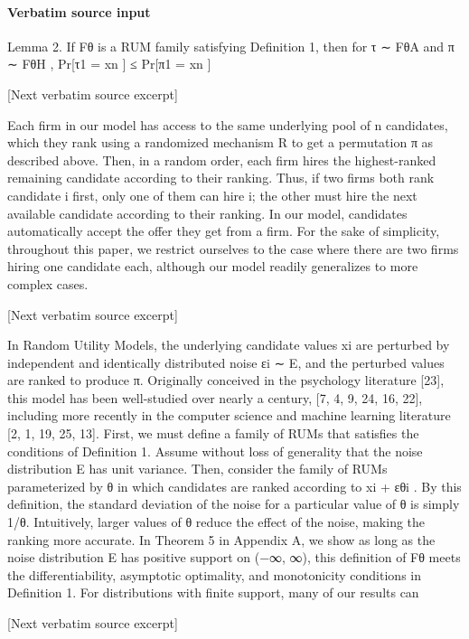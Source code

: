 \documentclass[10pt]{article}
\begin{document}
\paragraph{Verbatim source input}
\begin{ReviewVerbatim}
Lemma 2. If Fθ is a RUM family satisfying Definition 1, then for τ ∼ FθA and π ∼ FθH ,
Pr[τ1 = xn ] ≤ Pr[π1 = xn ]

[Next verbatim source excerpt]

Each firm in our model has access to the same underlying pool of n candidates, which they rank using
a randomized mechanism R to get a permutation π as described above. Then, in a random order, each
firm hires the highest-ranked remaining candidate according to their ranking. Thus, if two firms both rank
candidate i first, only one of them can hire i; the other must hire the next available candidate according to
their ranking. In our model, candidates automatically accept the offer they get from a firm. For the sake
of simplicity, throughout this paper, we restrict ourselves to the case where there are two firms hiring one
candidate each, although our model readily generalizes to more complex cases.

[Next verbatim source excerpt]

In Random Utility Models, the underlying candidate values xi are perturbed by independent and identically
distributed noise εi ∼ E, and the perturbed values are ranked to produce π. Originally conceived in the
psychology literature [23], this model has been well-studied over nearly a century, [7, 4, 9, 24, 16, 22],
including more recently in the computer science and machine learning literature [2, 1, 19, 25, 13].
First, we must define a family of RUMs that satisfies the conditions of Definition 1. Assume without loss of
generality that the noise distribution E has unit variance. Then, consider the family of RUMs parameterized
by θ in which candidates are ranked according to xi + εθi . By this definition, the standard deviation of the
noise for a particular value of θ is simply 1/θ. Intuitively, larger values of θ reduce the effect of the noise,
making the ranking more accurate. In Theorem 5 in Appendix A, we show as long as the noise distribution
E has positive support on (−∞, ∞), this definition of Fθ meets the differentiability, asymptotic optimality,
and monotonicity conditions in Definition 1. For distributions with finite support, many of our results can

[Next verbatim source excerpt]


\end{ReviewVerbatim}
\end{document}
